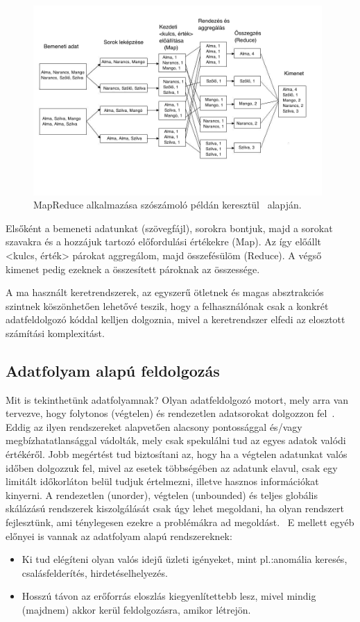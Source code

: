 \documentclass[a4paper,12pt]{article}
\begin{document}
\begin{figure}[ht!]
\centering
\includegraphics[width=110mm]{img/wordcountflow.jpg}
\caption{MapReduce alkalmazása szószámoló példán keresztül~\cite{hapreduce} alapján.
\label{wordcountflow}}
\end{figure}

Elsőként a bemeneti adatunkat (szövegfájl), sorokra bontjuk, majd a sorokat szavakra és a hozzájuk tartozó előfordulási értékekre (Map). Az így előállt <kulcs, érték> párokat aggregálom, majd összefésülöm (Reduce). A végső kimenet pedig ezeknek a összesített pároknak az összessége.

A ma használt keretrendszerek, az egyszerű ötletnek és magas absztrakciós szintnek köszönhetően lehetővé teszik, hogy a felhasználónak csak a konkrét adatfeldolgozó kóddal kelljen dolgoznia, mivel a keretrendszer elfedi az elosztott számítási komplexitást.~\cite{hadoop}

\subsection{Adatfolyam alapú feldolgozás}
Mit is tekinthetünk adatfolyamnak? Olyan adatfeldolgozó motort, mely arra van tervezve, hogy folytonos (végtelen) és rendezetlen adatsorokat dolgozzon fel~\cite{tyler}. Eddig az ilyen rendszereket alapvetően alacsony pontossággal és/vagy megbízhatatlansággal vádolták, mely csak spekulálni tud az egyes adatok valódi értékéről. Jobb megértést tud biztosítani az, hogy ha a végtelen adatunkat valós időben dolgozzuk fel, mivel az esetek többségében az adatunk elavul, csak egy limitált időkorláton belül tudjuk értelmezni, illetve hasznos információkat kinyerni. \newline
A rendezetlen (unorder), végtelen (unbounded) és teljes globális skálázású rendszerek kiszolgálását csak úgy lehet megoldani, ha olyan rendszert fejlesztünk, ami ténylegesen ezekre a problémákra ad megoldást.~\cite{tyler} E mellett egyéb előnyei is vannak az adatfolyam alapú rendszereknek: 
\begin{itemize}
\item Ki tud elégíteni olyan valós idejű üzleti igényeket, mint pl.:anomália keresés, csalásfelderítés, hirdetéselhelyezés.
\item Hosszú távon az erőforrás eloszlás kiegyenlítettebb lesz, mivel mindig (majdnem) akkor kerül feldolgozásra, amikor létrejön.
\end{itemize}
\end{document}

